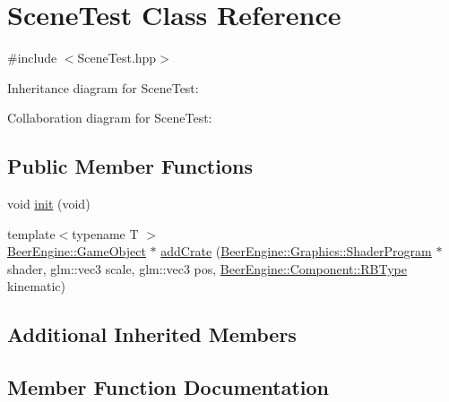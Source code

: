 \hypertarget{class_scene_test}{}\section{Scene\+Test Class Reference}
\label{class_scene_test}


{\ttfamily \#include $<$Scene\+Test.\+hpp$>$}



Inheritance diagram for Scene\+Test\+:


Collaboration diagram for Scene\+Test\+:
\subsection*{Public Member Functions}
\begin{DoxyCompactItemize}
\item 
void \mbox{\hyperlink{class_scene_test_aedded03410798c3705fb3fb028e56ab5}{init}} (void)
\item 
{\footnotesize template$<$typename T $>$ }\\\mbox{\hyperlink{class_beer_engine_1_1_game_object}{Beer\+Engine\+::\+Game\+Object}} $\ast$ \mbox{\hyperlink{class_scene_test_a29d4ffbd6a5035a4d62e9e59b311f791}{add\+Crate}} (\mbox{\hyperlink{class_beer_engine_1_1_graphics_1_1_shader_program}{Beer\+Engine\+::\+Graphics\+::\+Shader\+Program}} $\ast$shader, glm\+::vec3 scale, glm\+::vec3 pos, \mbox{\hyperlink{namespace_beer_engine_1_1_component_a2cfe279cc309b6420e792597940b8a33}{Beer\+Engine\+::\+Component\+::\+R\+B\+Type}} kinematic)
\end{DoxyCompactItemize}
\subsection*{Additional Inherited Members}


\subsection{Member Function Documentation}
\mbox{\label{class_scene_test_a29d4ffbd6a5035a4d62e9e59b311f791}} 
